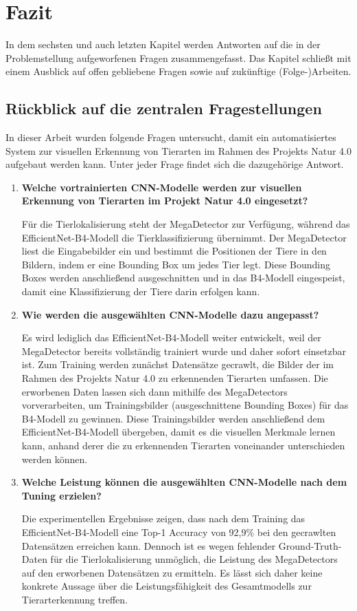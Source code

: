 \chapter{Fazit}

In dem sechsten und auch letzten Kapitel werden Antworten auf die in der Problemstellung aufgeworfenen Fragen zusammengefasst. Das Kapitel schließt mit einem Ausblick auf offen gebliebene Fragen sowie auf zukünftige (Folge-)Arbeiten.


\section{Rückblick auf die zentralen Fragestellungen}

In dieser Arbeit wurden folgende Fragen untersucht, damit ein automatisiertes System zur visuellen Erkennung von Tierarten im Rahmen des Projekts Natur 4.0 aufgebaut werden kann. Unter jeder Frage findet sich die dazugehörige Antwort.

\begin{enumerate}
	\item \textbf{Welche vortrainierten CNN-Modelle werden zur visuellen Erkennung von Tierarten im Projekt Natur 4.0 eingesetzt?}
	
	Für die Tierlokalisierung steht der MegaDetector zur Verfügung, während das EfficientNet-B4-Modell die Tierklassifizierung übernimmt. Der MegaDetector liest die Eingabebilder ein und bestimmt die Positionen der Tiere in den Bildern, indem er eine Bounding Box um jedes Tier legt. Diese Bounding Boxes werden anschließend ausgeschnitten und in das B4-Modell eingespeist, damit eine Klassifizierung der Tiere darin erfolgen kann.
	
	\item \textbf{Wie werden die ausgewählten CNN-Modelle dazu angepasst?}
	
	Es wird lediglich das EfficientNet-B4-Modell weiter entwickelt, weil der MegaDetector bereits vollständig trainiert wurde und daher sofort einsetzbar ist. Zum Training werden zunächst Datensätze gecrawlt, die Bilder der im Rahmen des Projekts Natur 4.0 zu erkennenden Tierarten umfassen. Die erworbenen Daten lassen sich dann mithilfe des MegaDetectors vorverarbeiten, um Trainingsbilder (ausgeschnittene Bounding Boxes) für das B4-Modell zu gewinnen. Diese Trainingsbilder werden anschließend dem EfficientNet-B4-Modell übergeben, damit es die visuellen Merkmale lernen kann, anhand derer die zu erkennenden Tierarten voneinander unterschieden werden können.
	
	\item \textbf{Welche Leistung können die ausgewählten CNN-Modelle nach dem Tuning erzielen?}
	
	Die experimentellen Ergebnisse zeigen, dass nach dem Training das EfficientNet-B4-Modell eine Top-1 Accuracy von 92,9\% bei den gecrawlten Datensätzen erreichen kann. Dennoch ist es wegen fehlender Ground-Truth-Daten für die Tierlokalisierung unmöglich, die Leistung des MegaDetectors auf den erworbenen Datensätzen zu ermitteln. Es lässt sich daher keine konkrete Aussage über die Leistungsfähigkeit des Gesamtmodells zur Tierarterkennung treffen.
	
\end{enumerate}

